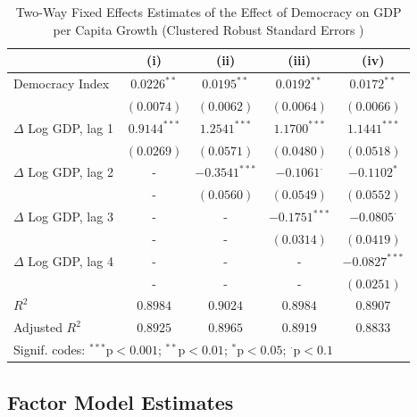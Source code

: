 \begin{table}[hbt]
\caption{Two-Way Fixed Effects Estimates of the Effect of Democracy on \ac{GDP} per Capita Growth
(Clustered Robust Standard Errors )}\label{within_results_diff}
\centering
\begin{tabular}{lcccc}
\toprule
                       & (i) & (ii) & (iii) & (iv) \\
\midrule
Democracy Index        & $0.0226^{**}$ & $0.0195^{**}$ & $0.0192^{**}$ & $0.0172^{**}$   \\
                       & $(0.0074)$    & $(0.0062)$    & $(0.0064)$    & $(0.0066)$      \\
$\Delta$ Log GDP, lag 1 & $0.9144^{***}$ & $1.2541^{***}$ & $1.1700^{***}$ & $1.1441^{***}$  \\
                       & $(0.0269)$    & $(0.0571)$    & $(0.0480)$    & $(0.0518)$      \\
$\Delta$ Log GDP, lag 2 & -             & $-0.3541^{***}$ & $-0.1061^{\cdot}$  & $-0.1102^{*}$   \\
                       & -             & $(0.0560)$    & $(0.0549)$    & $(0.0552)$      \\
$\Delta$ Log GDP, lag 3 & -             & -             & $-0.1751^{***}$ & $-0.0805^{\cdot}$ \\
                       & -             & -             & $(0.0314)$    & $(0.0419)$      \\
$\Delta$ Log GDP, lag 4 & -             & -             & -             & $-0.0827^{***}$ \\
                       & -             & -             & -             & $(0.0251)$      \\
\midrule
$R^2$                 & $0.8984$    & $0.9024$    & $0.8984$    & $0.8907$    \\
Adjusted  $R^2$       & $0.8925$    & $0.8965$    & $0.8919$    & $0.8833$    \\
\bottomrule
\multicolumn{5}{l}{Signif. codes: $^{***}$p$<0.001$; $^{**}$p$<0.01$; $^{*}$p$<0.05$; $^{\cdot}$p$<0.1$}
\end{tabular}
\end{table}





\subsection{Factor Model Estimates }\label{main_estimates}


